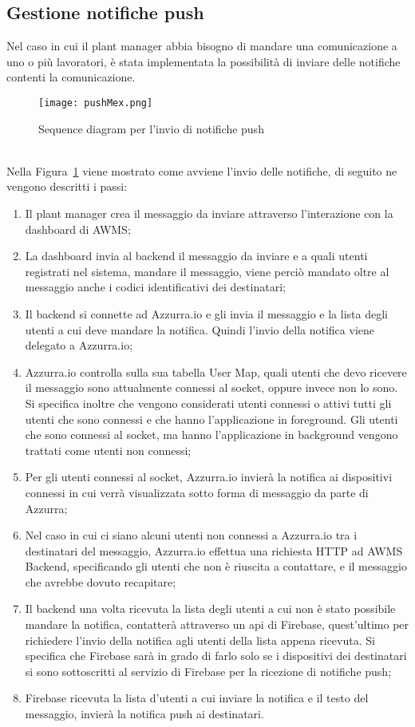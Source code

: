 \subsection{Gestione notifiche push}
Nel caso in cui il \gls{plant manager}\ap{[g]} abbia bisogno di mandare una comunicazione a uno o più lavoratori, è stata implementata la possibilità di inviare delle notifiche contenti la comunicazione.
\begin{figure}[h]
	\begin{center}
		\texttt{[image: pushMex.png]}
		\caption{Sequence diagram per l'invio di notifiche push}\label{fig:push}
	\end{center}
\end{figure}\\
Nella Figura~\ref{fig:push} viene mostrato come avviene l'invio delle notifiche, di seguito ne vengono descritti i passi:
\begin{enumerate}
	\item Il \gls{plant manager}\ap{[g]} crea il messaggio da inviare attraverso l'interazione con la dashboard di \gls{AWMS}\ap{[g]};
	\item La dashboard invia al backend il messaggio da inviare e a quali utenti registrati nel sistema, mandare il messaggio, viene perciò mandato oltre al messaggio anche i codici identificativi dei destinatari;
	\item Il backend si connette ad Azzurra.io e gli invia il messaggio e la lista degli utenti a cui deve mandare la notifica. Quindi l'invio della notifica viene delegato a Azzurra.io; 
	\item Azzurra.io controlla sulla sua tabella User Map, quali utenti che devo ricevere il messaggio sono attualmente connessi al socket, oppure invece non lo sono. Si specifica inoltre che vengono considerati utenti connessi o attivi tutti gli utenti che sono connessi e che hanno l’applicazione in foreground. Gli utenti che sono connessi al socket, ma hanno l’applicazione in background vengono trattati come utenti non connessi;
	\item Per gli utenti connessi al socket, Azzurra.io invierà la notifica ai dispositivi connessi in cui verrà visualizzata sotto forma di messaggio da parte di Azzurra;
	\item Nel caso in cui ci siano alcuni utenti non connessi a Azzurra.io tra i destinatari del messaggio, Azzurra.io effettua una richiesta HTTP ad AWMS Backend, specificando gli utenti che non è riuscita a contattare, e il messaggio che avrebbe dovuto recapitare;
	\item Il backend una volta ricevuta la lista degli utenti a cui non è stato possibile mandare la notifica, contatterà attraverso un \gls{api}\ap{[g]} di Firebase, quest'ultimo per richiedere l'invio della notifica agli utenti della lista appena ricevuta. Si specifica che Firebase sarà in grado di farlo solo se i dispositivi dei destinatari si sono sottoscritti al servizio di Firebase per la ricezione di notifiche push;
	\item Firebase ricevuta la lista d'utenti a cui inviare la notifica e il testo del messaggio, invierà la notifica push ai destinatari.
\end{enumerate}